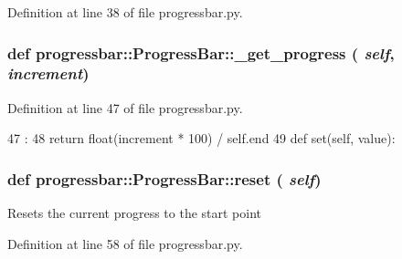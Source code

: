 Definition at line 38 of file progressbar.py.


\hypertarget{classprogressbar_1_1ProgressBar_af11b2da67d3c42a65defe21b4abf7351}{
\subsubsection[{\_\-get\_\-progress}]{\setlength{\rightskip}{0pt plus 5cm}def progressbar::ProgressBar::\_\-get\_\-progress ( {\em self}, \/   {\em increment})}}
\label{classprogressbar_1_1ProgressBar_af11b2da67d3c42a65defe21b4abf7351}


Definition at line 47 of file progressbar.py.


\begin{DoxyCode}
47                                       :
48         return float(increment * 100) / self.end
49 
    def set(self, value):
\end{DoxyCode}
\hypertarget{classprogressbar_1_1ProgressBar_a1e3174a60591ce40f957310b350d62d4}{
\subsubsection[{reset}]{\setlength{\rightskip}{0pt plus 5cm}def progressbar::ProgressBar::reset ( {\em self})}}
\label{classprogressbar_1_1ProgressBar_a1e3174a60591ce40f957310b350d62d4}
\begin{DoxyVerb}Resets the current progress to the start point\end{DoxyVerb}
 

Definition at line 58 of file progressbar.py.


